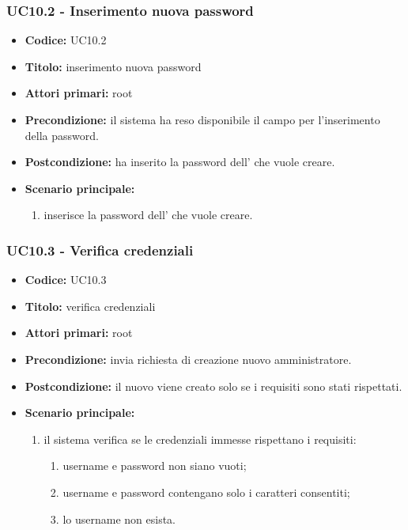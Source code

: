 \documentclass[casi-duso]{subfiles}
\begin{document}
\subsubsection{UC10.2 - Inserimento nuova password}
\label{subsub:UC10.2}
\begin{itemize}
  \item \textbf{Codice:} UC10.2
  \item \textbf{Titolo:} inserimento nuova password
  \item \textbf{Attori primari:} root
  \item \textbf{Precondizione:} il sistema ha reso disponibile il campo per l'inserimento della password.
  \item \textbf{Postcondizione:}  ha inserito la password dell' che vuole creare.
  \item \textbf{Scenario principale:} 
  \begin{enumerate}
    \item {} inserisce la password dell' che vuole creare.
  \end{enumerate}
\end{itemize}

\subsubsection{UC10.3 - Verifica credenziali}
\label{subsub:UC10.3}
\begin{itemize}
  \item \textbf{Codice:} UC10.3
  \item \textbf{Titolo:} verifica credenziali
  \item \textbf{Attori primari:} root
  \item \textbf{Precondizione:}  invia richiesta di creazione nuovo amministratore.
  \item \textbf{Postcondizione:} il nuovo  viene creato solo se i requisiti sono stati rispettati.
  \item \textbf{Scenario principale:} 
  \begin{enumerate}
    \item il sistema verifica se le credenziali immesse rispettano i requisiti:
    \begin{enumerate}
      \item username e password non siano vuoti;
      \item username e password contengano solo i caratteri consentiti;
      \item lo username non esista.
    \end{enumerate}
  \end{enumerate}
\end{itemize}
\end{document}
